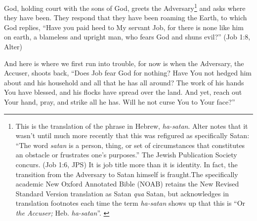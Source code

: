 God, holding court with the sons of God, greets the Adversary\footnote{This is the translation of the phrase in Hebrew, \emph{ha-satan}. Alter notes that it wasn't until much more recently that this was refigured as specifically Satan: ``The word \emph{satan} is a person, thing, or set of circumstances that constitutes an obstacle or frustrates one's purposes.''\footnotemark \parencite[466]{alter} The Jewish Publication Society concurs. (Job 1:6, JPS) It is job title more than it is identity. In fact, the transition from the Adversary to Satan himself is fraught.\footnotemark The specifically academic New Oxford Annotated Bible (NOAB) retains the New Revised Standard Version translation as Satan \emph{qua} Satan, but acknowledges in translation footnotes each time the term \emph{ha-satan} shows up that this is ``Or \emph{the Accuser;} Heb. \emph{ha-satan}''. \parencite[736]{noab}\addtocounter{footnote}{-1}} and asks where they have been. They respond that they have been roaming the Earth, to which God replies, ``Have you paid heed to My servant Job, for there is none like him on earth, a blameless and upright man, who fears God and shuns evil?'' (Job 1:8, Alter)

And here is where we first run into trouble, for now is when the Adversary, the Accuser, shoots back, ``Does Job fear God for nothing? Have You not hedged him about and his household and all that he has all around? The work of his hands You have blessed, and his flocks have spread over the land. And yet, reach out Your hand, pray, and strike all he has. Will he not curse You to Your face?''

